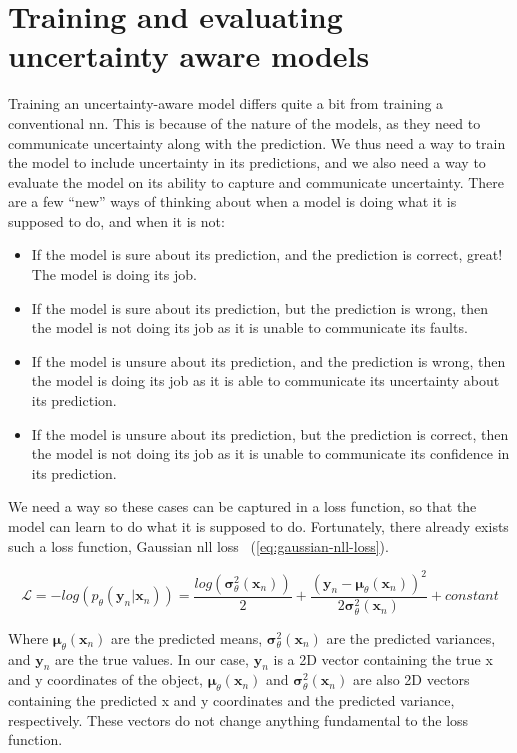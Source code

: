 \section{Training and evaluating uncertainty aware models}\label{ch:models-for-uncertainty-aware-object-detection_section:training-evaluation}
Training an uncertainty-aware model differs quite a bit from training a conventional \gls{nn}.
This is because of the nature of the models, as they need to communicate uncertainty along with the prediction.
We thus need a way to train the model to include uncertainty in its predictions, and we also need a way to evaluate the model on its ability to capture and communicate uncertainty.
There are a few ``new'' ways of thinking about when a model is doing what it is supposed to do, and when it is not:
\begin{itemize}
    \item If the model is sure about its prediction, and the prediction is correct, great! The model is doing its job.
    \item If the model is sure about its prediction, but the prediction is wrong, then the model is not doing its job as it is unable to communicate its faults.
    \item If the model is unsure about its prediction, and the prediction is wrong, then the model is doing its job as it is able to communicate its uncertainty about its prediction.
    \item If the model is unsure about its prediction, but the prediction is correct, then the model is not doing its job as it is unable to communicate its confidence in its prediction.
\end{itemize}
We need a way so these cases can be captured in a loss function, so that the model can learn to do what it is supposed to do.
Fortunately, there already exists such a loss function, Gaussian \gls{nll} loss~\cite{src:deep-ensemble-methods} (\cref{eq:gaussian-nll-loss}).

\begin{equation}\label{eq:gaussian-nll-loss}
    \mathcal{L} = -log(p_\theta(\mathbf{y}_n|\mathbf{x}_n)) = \frac{log(\bm{\sigma}^2_\theta(\mathbf{x}_n))}{2} + \frac{(\mathbf{y}_n-\bm{\mu}_\theta(\mathbf{x}_n))^2}{2\bm{\sigma}^2_\theta(\mathbf{x}_n)} + constant
\end{equation}

Where $\bm{\mu}_\theta(\mathbf{x}_n)$ are the predicted means, $\bm{\sigma}^2_\theta(\mathbf{x}_n)$ are the predicted variances, and $\mathbf{y}_n$ are the true values.
In our case, $\mathbf{y}_n$ is a 2D vector containing the true x and y coordinates of the object, $\bm{\mu}_\theta(\mathbf{x}_n)$ and $\bm{\sigma}^2_\theta(\mathbf{x}_n)$ are also 2D vectors containing the predicted x and y coordinates and the predicted variance, respectively.
These vectors do not change anything fundamental to the loss function.

